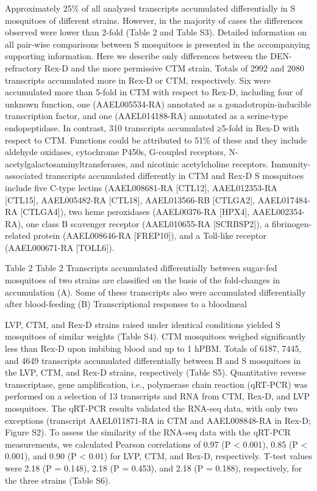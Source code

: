 Approximately 25\% of all analyzed transcripts accumulated differentially in S mosquitoes of different strains. However, in the majority of cases the differences observed were lower than 2-fold (Table 2 and Table S3). Detailed information on all pair-wise comparisons between S mosquitoes is presented in the accompanying supporting information. Here we describe only differences between the DEN-refractory Rex-D and the more permissive CTM strain. Totals of 2992 and 2080 transcripts accumulated more in Rex-D or CTM, respectively. Six were accumulated more than 5-fold in CTM with respect to Rex-D, including four of unknown function, one (AAEL005534-RA) annotated as a gonadotropin-inducible transcription factor, and one (AAEL014188-RA) annotated as a serine-type endopeptidase. In contrast, 310 transcripts accumulated ≥5-fold in Rex-D with respect to CTM. Functions could be attributed to 51\% of these and they include aldehyde oxidases, cytochrome P450s, G-coupled receptors, N-acetylgalactosaminyltransferases, and nicotinic acetylcholine receptors. Immunity-associated transcripts accumulated differently in CTM and Rex-D S mosquitoes include five C-type lectins (AAEL008681-RA [CTL12], AAEL012353-RA [CTL15], AAEL005482-RA [CTL18], AAEL013566-RB [CTLGA2], AAEL017484-RA [CTLGA4]), two heme peroxidases (AAEL00376-RA [HPX4], AAEL002354-RA), one class B scavenger receptor (AAEL010655-RA [SCRBSP2]), a fibrinogen-related protein (AAEL008646-RA [FREP10]), and a Toll-like receptor (AAEL000671-RA [TOLL6]).

Table 2 
Table 2 
Transcripts accumulated differentially between sugar-fed mosquitoes of two strains are classified on the basis of the fold-changes in accumulation (A). Some of these transcripts also were accumulated differentially after blood-feeding (B)
Transcriptional responses to a bloodmeal

LVP, CTM, and Rex-D strains raised under identical conditions yielded S mosquitoes of similar weights (Table S4). CTM mosquitoes weighed significantly less than Rex-D upon imbibing blood and up to 1 hPBM. Totals of 6187, 7445, and 4649 transcripts accumulated differentially between B and S mosquitoes in the LVP, CTM, and Rex-D strains, respectively (Table S5). Quantitative reverse transcriptase, gene amplification, i.e., polymerase chain reaction (qRT-PCR) was performed on a selection of 13 transcripts and RNA from CTM, Rex-D, and LVP mosquitoes. The qRT-PCR results validated the RNA-seq data, with only two exceptions (transcript AAEL011871-RA in CTM and AAEL008848-RA in Rex-D; Figure S2). To assess the similarity of the RNA-seq data with the qRT-PCR measurements, we calculated Pearson correlations of 0.97 (P < 0.001), 0.85 (P < 0.001), and 0.90 (P < 0.01) for LVP, CTM, and Rex-D, respectively. T-test values were 2.18 (P = 0.148), 2.18 (P = 0.453), and 2.18 (P = 0.188), respectively, for the three strains (Table S6).

